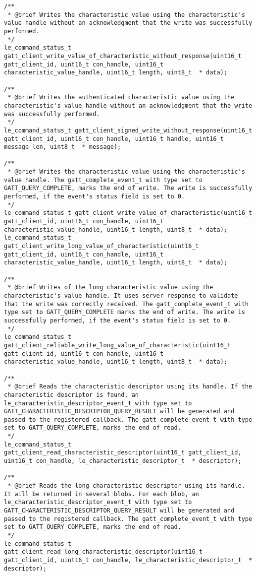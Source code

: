 \begin{lstlisting}
/** 
 * @brief Writes the characteristic value using the characteristic's value handle without an acknowledgment that the write was successfully performed.
 */
le_command_status_t gatt_client_write_value_of_characteristic_without_response(uint16_t gatt_client_id, uint16_t con_handle, uint16_t characteristic_value_handle, uint16_t length, uint8_t  * data);

/** 
 * @brief Writes the authenticated characteristic value using the characteristic's value handle without an acknowledgment that the write was successfully performed.
 */
le_command_status_t gatt_client_signed_write_without_response(uint16_t gatt_client_id, uint16_t con_handle, uint16_t handle, uint16_t message_len, uint8_t  * message);

/** 
 * @brief Writes the characteristic value using the characteristic's value handle. The gatt_complete_event_t with type set to GATT_QUERY_COMPLETE, marks the end of write. The write is successfully performed, if the event's status field is set to 0.
 */
le_command_status_t gatt_client_write_value_of_characteristic(uint16_t gatt_client_id, uint16_t con_handle, uint16_t characteristic_value_handle, uint16_t length, uint8_t  * data);
le_command_status_t gatt_client_write_long_value_of_characteristic(uint16_t gatt_client_id, uint16_t con_handle, uint16_t characteristic_value_handle, uint16_t length, uint8_t  * data);

/** 
 * @brief Writes of the long characteristic value using the characteristic's value handle. It uses server response to validate that the write was correctly received. The gatt_complete_event_t with type set to GATT_QUERY_COMPLETE marks the end of write. The write is successfully performed, if the event's status field is set to 0.
 */
le_command_status_t gatt_client_reliable_write_long_value_of_characteristic(uint16_t gatt_client_id, uint16_t con_handle, uint16_t characteristic_value_handle, uint16_t length, uint8_t  * data);

/** 
 * @brief Reads the characteristic descriptor using its handle. If the characteristic descriptor is found, an le_characteristic_descriptor_event_t with type set to GATT_CHARACTERISTIC_DESCRIPTOR_QUERY_RESULT will be generated and passed to the registered callback. The gatt_complete_event_t with type set to GATT_QUERY_COMPLETE, marks the end of read.
 */
le_command_status_t gatt_client_read_characteristic_descriptor(uint16_t gatt_client_id, uint16_t con_handle, le_characteristic_descriptor_t  * descriptor);

/** 
 * @brief Reads the long characteristic descriptor using its handle. It will be returned in several blobs. For each blob, an le_characteristic_descriptor_event_t with type set to GATT_CHARACTERISTIC_DESCRIPTOR_QUERY_RESULT will be generated and passed to the registered callback. The gatt_complete_event_t with type set to GATT_QUERY_COMPLETE, marks the end of read.
 */
le_command_status_t gatt_client_read_long_characteristic_descriptor(uint16_t gatt_client_id, uint16_t con_handle, le_characteristic_descriptor_t  * descriptor);


\end{lstlisting}
